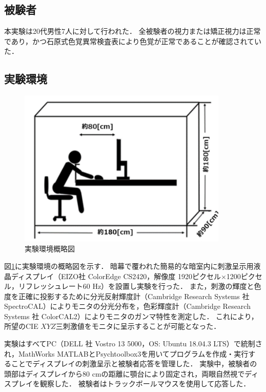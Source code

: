         \subsection{被験者}
            本実験は20代男性7人に対して行われた．
            全被験者の視力または矯正視力は正常であり，かつ石原式色覚異常検査表により色覚が正常であることが確認されていた．

        \subsection{実験環境}

            \begin{figure}[h]
                \centering
                \includegraphics[width=10.0cm]{./img/darkroom_p.png}
                \caption{実験環境概略図}
                \label{darkroom}
            \end{figure}
            
            図\ref{darkroom}に実験環境の概略図を示す．
            暗幕で覆われた簡易的な暗室内に刺激呈示用液晶ディスプレイ（EIZO社 ColorEdge CS2420，解像度 1920ピクセル$\times$1200ピクセル，リフレッシュレート60 Hz）を設置し実験を行った．
            また，刺激の輝度と色度を正確に投影するために分光反射輝度計（Cambridge Research Systems 社 SpectroCAL）によりモニタの分光分布を，色彩輝度計（Cambridge Research Systems 社 ColorCAL2）によりモニタのガンマ特性を測定した．
            これにより，所望のCIE $XYZ$三刺激値をモニタに呈示することが可能となった．
            
            実験はすべてPC（DELL 社 Vostro 13 5000，OS: Ubuntu 18.04.3 LTS）で統制され，MathWorks MATLABとPsychtoolbox3\cite{Psychtoolbox}を用いてプログラムを作成・実行することでディスプレイの刺激呈示と被験者応答を管理した．
            実験中，被験者の頭部はディスプレイから80 cmの距離に顎台により固定され，両眼自然視でディスプレイを観察した．
            被験者はトラックボールマウスを使用して応答した．

